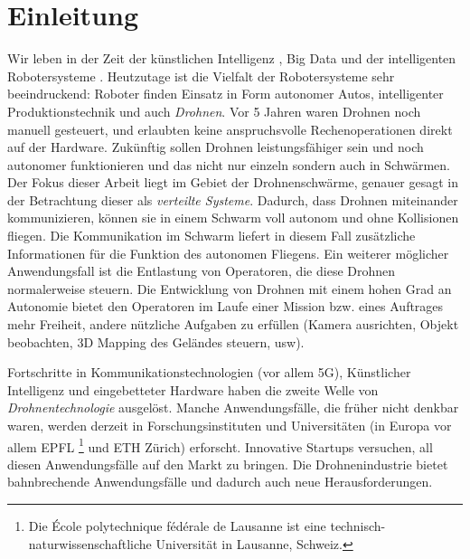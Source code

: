\chapter{Einleitung}
\label{cha:Einleitung}

Wir leben in der Zeit der künstlichen Intelligenz \cite{MITai}, Big Data \cite{MITbigData, MITbigData2} und der intelligenten Robotersysteme \cite{MITrobots, MITrobots2}. Heutzutage ist die Vielfalt der Robotersysteme sehr beeindruckend: Roboter finden Einsatz in Form autonomer Autos, intelligenter Produktionstechnik und auch \textit{Drohnen}. Vor 5 Jahren waren Drohnen noch manuell gesteuert, und erlaubten keine anspruchsvolle Rechenoperationen direkt auf der Hardware. Zukünftig sollen Drohnen leistungsfähiger sein und noch autonomer funktionieren und das nicht nur einzeln sondern auch in Schwärmen. Der Fokus dieser Arbeit liegt im Gebiet der Drohnenschwärme, genauer gesagt in der Betrachtung dieser als \textit{verteilte Systeme}. Dadurch, dass Drohnen miteinander kommunizieren, können sie in einem Schwarm voll autonom und ohne Kollisionen fliegen. Die Kommunikation im Schwarm liefert in diesem Fall zusätzliche Informationen für die Funktion des autonomen Fliegens. Ein weiterer möglicher Anwendungsfall ist die Entlastung von Operatoren, die diese Drohnen normalerweise steuern. Die Entwicklung von Drohnen mit einem hohen Grad an Autonomie bietet den Operatoren im Laufe einer Mission bzw. eines Auftrages mehr Freiheit, andere nützliche Aufgaben zu erfüllen (Kamera ausrichten, Objekt beobachten, 3D Mapping des Geländes steuern, usw).

Fortschritte in Kommunikationstechnologien (vor allem 5G), Künstlicher Intelligenz und eingebetteter Hardware haben die zweite Welle von \textit{Drohnentechnologie} ausgelöst. Manche Anwendungsfälle, die früher nicht denkbar waren, werden derzeit in Forschungsinstituten und Universitäten (in Europa vor allem EPFL  \footnote{Die École polytechnique fédérale de Lausanne ist eine technisch-naturwissenschaftliche Universität in Lausanne, Schweiz.} und ETH Zürich) erforscht. Innovative Startups versuchen, all diesen Anwendungsfälle auf den Markt zu bringen. Die Drohnenindustrie bietet bahnbrechende Anwendungsfälle und dadurch auch neue Herausforderungen.

